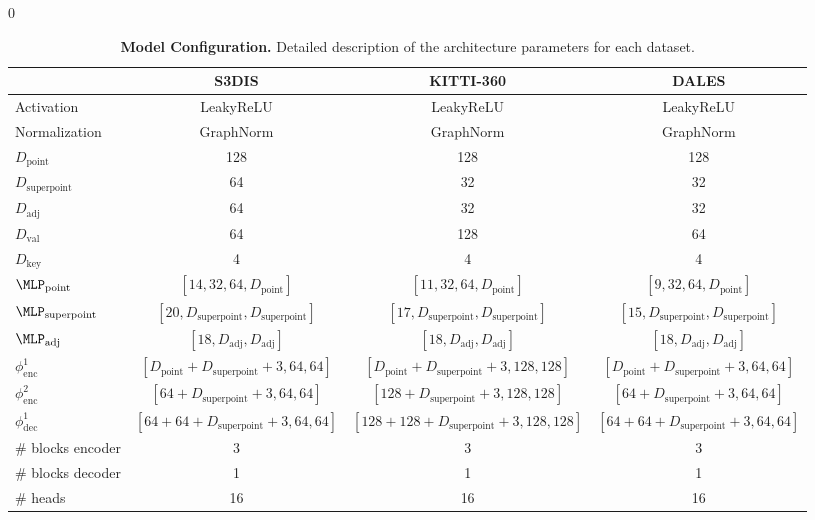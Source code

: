  0
\begin{table*}
\caption{\textbf{Model Configuration.} Detailed description of the \SHORTHAND architecture parameters for each dataset.}
\label{tab:implementation}
\centering
\small{
\begin{tabular}{@{}lccc@{}}
    \toprule
     & S3DIS & KITTI-360 & DALES \\
 
    \midrule
    Activation & LeakyReLU & LeakyReLU & LeakyReLU \\
    Normalization & GraphNorm & GraphNorm & GraphNorm \\
    $D_\text{point}$         & 128 & 128 & 128 \\
    $D_\text{superpoint}$    & 64 & 32 & 32 \\
    $D_\text{adj}$           & 64 & 32 & 32 \\
    $D_\text{val}$           & 64 & 128 & 64 \\
    $D_\text{key}$           & 4 & 4 & 4 \\
    $\MLP_\text{point}$      & \footnotesize $[14,32,64,D_\text{point}]$      & \footnotesize $[11,32,64,D_\text{point}]$          & \footnotesize $[9,32,64,D_\text{point}]$ \\
    $\MLP_\text{superpoint}$ & \footnotesize $[20,D_\text{superpoint},D_\text{superpoint}]$          & \footnotesize $[17,D_\text{superpoint},D_\text{superpoint}]$              & \footnotesize $[15,D_\text{superpoint}, D_\text{superpoint}]$ \\
    $\MLP_\text{adj}$        & \footnotesize $[18,D_\text{adj},D_\text{adj}]$          & \footnotesize $[18,D_\text{adj},D_\text{adj}]$              & \footnotesize $[18,D_\text{adj},D_\text{adj}]$ \\
    $\phi^1_\text{enc}$      & \footnotesize $[D_\text{point}+D_\text{superpoint}+3,64,64]$                 & \footnotesize $[D_\text{point}+D_\text{superpoint}+3,128,128]$      & \footnotesize $[D_\text{point}+D_\text{superpoint}+3,64,64]$ \\
    $\phi^2_\text{enc}$      & \footnotesize $[64+D_\text{superpoint}+3,64,64]$                  & \footnotesize $[128+D_\text{superpoint}+3,128,128]$      & \footnotesize $[64+D_\text{superpoint}+3,64,64]$ \\
    $\phi^1_\text{dec}$      & \footnotesize $[64+64+D_\text{superpoint}+3,64,64]$               & \footnotesize $[128+128+D_\text{superpoint}+3,128,128]$  & \footnotesize $[64+64+D_\text{superpoint}+3,64,64]$ \\

    \# blocks encoder        & 3 & 3 & 3 \\
    \# blocks decoder        & 1 & 1 & 1 \\
    \# heads                 & 16 & 16 & 16 \\
    
    \bottomrule
\end{tabular}}
\end{table*} \fi

